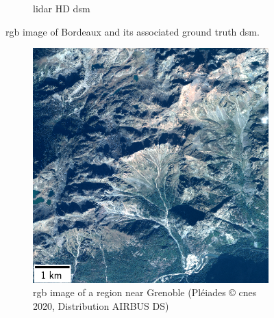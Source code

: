 \begin{figure}
\begin{subfigure}[t]{0.48\linewidth}
        \caption{\acrshort{lidar} HD \acrshort{dsm}}
        \label{fig:miniature_Bordeaux_gt}
    \end{subfigure}
    \caption{\acrshort{rgb} image of Bordeaux and its associated ground truth \acrshort{dsm}.}
    \label{fig:miniature_Bordeaux}
\end{figure}

\begin{figure}
    \centering
    \begin{subfigure}[t]{0.48\linewidth}
        \flushleft
        \includegraphics[width=\linewidth]{Images/Chap_6/miniature_Grenoble.png}
        \caption{\acrshort{rgb} image of a region near Grenoble (Pléiades © \acrshort{cnes} 2020, Distribution AIRBUS DS)}
        \label{fig:miniature_Grenoble_rgb}
    \end{subfigure}\hfill
    \begin{subfigure}[t]{0.48\linewidth}
        \flushright

\end{subfigure}
\end{figure}
